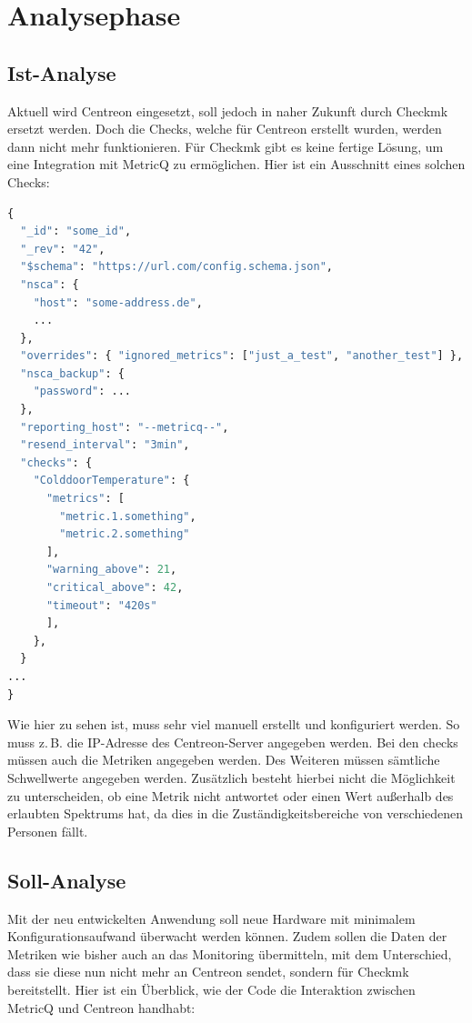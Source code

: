 \section{Analysephase}

\subsection{Ist-Analyse}
Aktuell wird \Gls{Centreon} eingesetzt, soll jedoch in naher Zukunft durch \Gls{Checkmk} ersetzt werden.
Doch die Checks, welche für \Gls{Centreon} erstellt wurden, werden dann nicht mehr funktionieren.
Für \Gls{Checkmk} gibt es keine fertige Lösung, um eine Integration mit \Gls{MetricQ} zu ermöglichen.
Hier ist ein Ausschnitt eines solchen Checks:

\begin{lstlisting}[language=Python, caption=Centreon Check]
{
  "_id": "some_id",
  "_rev": "42",
  "$schema": "https://url.com/config.schema.json",
  "nsca": {
    "host": "some-address.de",
    ...
  },
  "overrides": { "ignored_metrics": ["just_a_test", "another_test"] },
  "nsca_backup": {
    "password": ...
  },
  "reporting_host": "--metricq--",
  "resend_interval": "3min",
  "checks": {
    "ColddoorTemperature": {
      "metrics": [
        "metric.1.something",
        "metric.2.something"
      ],
      "warning_above": 21,
      "critical_above": 42,
      "timeout": "420s"
      ],
    },
  }
...
}
\end{lstlisting}

\noindent
Wie hier zu sehen ist, muss sehr viel manuell erstellt und konfiguriert werden.
So muss z.\,B. die IP-Adresse des \Gls{Centreon}-Server angegeben werden.
Bei den checks müssen auch die Metriken angegeben werden.
Des Weiteren müssen sämtliche Schwellwerte angegeben werden.
Zusätzlich besteht hierbei nicht die Möglichkeit zu unterscheiden, ob eine Metrik nicht antwortet oder einen Wert außerhalb des erlaubten Spektrums hat, da dies in die Zuständigkeitsbereiche von verschiedenen Personen fällt.

\subsection{Soll-Analyse}\label{sec:soll-analyse}
Mit der neu entwickelten Anwendung soll neue Hardware mit minimalem Konfigurationsaufwand überwacht werden können.
Zudem sollen die Daten der Metriken wie bisher auch an das Monitoring übermitteln, mit dem Unterschied, dass sie diese nun nicht mehr an \Gls{Centreon} sendet, sondern für \Gls{Checkmk} bereitstellt.
Hier ist ein Überblick, wie der Code die Interaktion zwischen \Gls{MetricQ} und \Gls{Centreon} handhabt:

